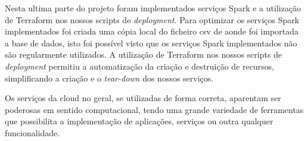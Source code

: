 \documentclass[11pt,a4paper]{article}
\begin{document}
Nesta ultima parte do projeto foram implementados serviços Spark e a utilização de Terraform nos nossos scripts de \textit{deployment}. Para optimizar os serviços Spark implementados foi criada uma cópia local do ficheiro csv de aonde foi importada a base de dados, isto foi possível visto que os serviços Spark implementados não são regularmente utilizados. A utilização de Terraform nos nossos scripts de \textit{deployment} permitiu a automatização da criação e destruição de recursos, simplificando a criação e o \textit{tear-down} dos nossos serviços.

Os serviços da cloud no geral, se utilizadas de forma correta, aparentam ser poderosas em sentido computacional, tendo uma grande variedade de ferramentas que possibilita a implementação de aplicações, serviços ou outra qualquer funcionalidade.
\end{document}
